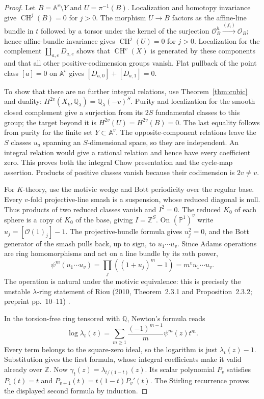 \begin{proof}
Let $B=\mathbb A^v\setminus Y$ and $U=\pi^{-1}(B)$. Localization and homotopy invariance give $\operatorname{CH}^j(B)=0$ for $j>0$. The morphism $U\to B$ factors as the affine-line bundle in $t$ followed by a torsor under the kernel of the surjection $\mathcal O_B^h\xrightarrow{(f_i)}\mathcal O_B$; hence affine-bundle invariance gives $\operatorname{CH}^j(U)=0$ for $j>0$. Localization for the complement $\coprod_{a,e}D_{a,e}$ shows that $\operatorname{CH}^v(X)$ is generated by these components and that all other positive-codimension groups vanish. Flat pullback of the point class $[a]=0$ on $\mathbb A^v$ gives $[D_{a,0}]+[D_{a,1}]=0$.

To show that there are no further integral relations, use Theorem~\ref{thm:cubic} and duality: $H^{2v}(X_{\bar k},\mathbb Q_\lambda)=\mathbb Q_\lambda(-v)^S$. Purity and localization for the smooth closed complement give a surjection from its $2S$ fundamental classes to this group; the target beyond it is $H^{2v}(U)=H^{2v}(B)=0$. The last equality follows from purity for the finite set $Y\subset\mathbb A^v$. The opposite-component relations leave the $S$ classes $u_a$ spanning an $S$-dimensional space, so they are independent. An integral relation would give a rational relation and hence have every coefficient zero. This proves both the integral Chow presentation and the cycle-map assertion. Products of positive classes vanish because their codimension is $2v\neq v$.

For $K$-theory, use the motivic wedge and Bott periodicity over the regular base. Every $v$-fold projective-line smash is a suspension, whose reduced diagonal is null. Thus products of two reduced classes vanish and $I^2=0$. The reduced $K_0$ of each sphere is a copy of $K_0$ of the base, giving $I=\mathbb Z^S$. On $(\mathbb P^1)^v$ write $u_j=[\mathcal O(1)_j]-1$. The projective-bundle formula gives $u_j^2=0$, and the Bott generator of the smash pulls back, up to sign, to $u_1\cdots u_v$. Since Adams operations are ring homomorphisms and act on a line bundle by its $m$th power,
\[
 \psi^m(u_1\cdots u_v)
    =\prod_j((1+u_j)^m-1)=m^v u_1\cdots u_v.
\]
The operation is natural under the motivic equivalence: this is precisely the unstable $\lambda$-ring statement of Riou (2010, Theorem~2.3.1 and Proposition~2.3.2; preprint pp.~10--11) \cite{ff-riou}.

In the torsion-free ring tensored with $\mathbb Q$, Newton's formula reads
\[
 \log\lambda_t(z)=\sum_{m\geq1}\frac{(-1)^{m-1}}m\psi^m(z)t^m.
\]
Every term belongs to the square-zero ideal, so the logarithm is just $\lambda_t(z)-1$. Substitution gives the first formula, whose integral coefficients make it valid already over $\mathbb Z$. Now $\gamma_t(z)=\lambda_{t/(1-t)}(z)$. Its scalar polynomial $P_v$ satisfies
$P_1(t)=t$ and $P_{v+1}(t)=t(1-t)P_v'(t)$. The Stirling recurrence proves the displayed second formula by induction.


\end{proof}
